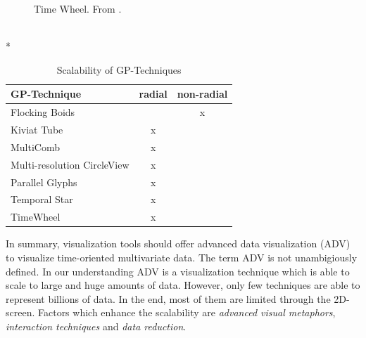 \begin{figure}[H]
    \centering
    \caption{Time Wheel. From \cite{Aigner2011}.}
    \label{fig:timewheel}
\end{figure}
\\*

\begin{table}[H]
	\centering
	\caption[Scalability of GP-Techniques]{Scalability of GP-Techniques}
	\label{GPscalability}
	\begin{tabu}{lcc}
	\toprule
	GP-Technique & radial & non-radial \\
	\midrule
	Flocking Boids &  & x \\
	Kiviat Tube & x &  \\
	MultiComb & x &  \\
	Multi-resolution CircleView & x &  \\
	Parallel Glyphs & x &  \\
    Temporal Star & x &  \\
	TimeWheel & x & \\
	\bottomrule
	\end{tabu}
\end{table}


In summary, visualization tools should offer advanced data visualization (ADV) to visualize time-oriented multivariate data. The term ADV is not unambigiously defined\cite{Aigner2011,Keim}. 
In our understanding ADV is a visualization technique which is able to scale to large and huge amounts of data.
However, only few techniques are able to represent billions of data. In the end, most of them are limited through the 2D-screen. Factors which enhance the scalability are \textit{advanced visual metaphors}, \textit{interaction techniques} and \textit{data reduction}. 



